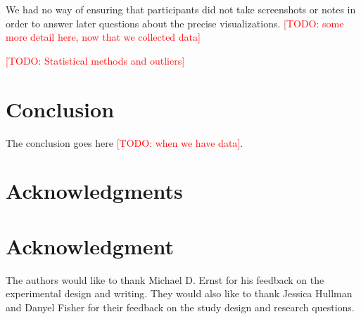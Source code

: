 \documentclass[10pt,journal,compsoc]{IEEEtran}
\newcommand{\note}[2]{\textcolor{#1}{[#2]}}
\newcommand{\todo}[1]{\note{red}{TODO: #1}}
\begin{document}
We had no way of ensuring that participants did not take screenshots or notes in order to answer later questions about the precise visualizations.
\todo{some more detail here, now that we collected data}

\todo{Statistical methods and outliers}

\section{Conclusion}
The conclusion goes here \todo{when we have data}.


\ifCLASSOPTIONcompsoc
  \section*{Acknowledgments}
\else
  \section*{Acknowledgment}
\fi


The authors would like to thank Michael D. Ernst for his feedback on the experimental design and writing.
They would also like to thank Jessica Hullman and Danyel Fisher for their feedback on the study design and research questions.

\ifCLASSOPTIONcaptionsoff
  \newpage
\fi







%

\end{document}
